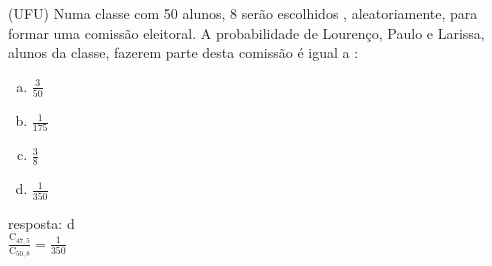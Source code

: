 \begin{ex}
 (UFU) Numa classe com 50 alunos, 8 serão escolhidos , aleatoriamente, para formar uma comissão eleitoral.  A probabilidade de Lourenço, Paulo e Larissa, alunos da classe, fazerem parte desta comissão é igual a :
    \begin{enumerate}[(a)]
    \item $\frac{3}{50}$
    \item $\frac{1}{175}$
    \item $\frac{3}{8}$
    \item $\frac{1}{350}$
    \end{enumerate}
      \begin{sol}
       resposta: d \\
       $\frac{\mathrm{C}_{{47},5}}{\mathrm{C}_{{50},8}}=\frac{1}{350}$
      \end{sol}
\end{ex}